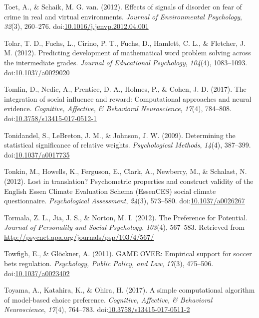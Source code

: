 \documentclass[english,man]{apa6}
\theoremstyle{definition}
\theoremstyle{definition}
\theoremstyle{definition}
\theoremstyle{remark}
\begin{document}
\hypertarget{ref-Toet2012}{}
Toet, A., \& Schaik, M. G. van. (2012). Effects of signals of disorder
on fear of crime in real and virtual environments. \emph{Journal of
Environmental Psychology}, \emph{32}(3), 260--276.
doi:\href{https://doi.org/10.1016/j.jenvp.2012.04.001}{10.1016/j.jenvp.2012.04.001}

\hypertarget{ref-Tolar2012}{}
Tolar, T. D., Fuchs, L., Cirino, P. T., Fuchs, D., Hamlett, C. L., \&
Fletcher, J. M. (2012). Predicting development of mathematical word
problem solving across the intermediate grades. \emph{Journal of
Educational Psychology}, \emph{104}(4), 1083--1093.
doi:\href{https://doi.org/10.1037/a0029020}{10.1037/a0029020}

\hypertarget{ref-Tomlin2017}{}
Tomlin, D., Nedic, A., Prentice, D. A., Holmes, P., \& Cohen, J. D.
(2017). The integration of social influence and reward: Computational
approaches and neural evidence. \emph{Cognitive, Affective, \&
Behavioral Neuroscience}, \emph{17}(4), 784--808.
doi:\href{https://doi.org/10.3758/s13415-017-0512-1}{10.3758/s13415-017-0512-1}

\hypertarget{ref-Tonidandel2009}{}
Tonidandel, S., LeBreton, J. M., \& Johnson, J. W. (2009). Determining
the statistical significance of relative weights. \emph{Psychological
Methods}, \emph{14}(4), 387--399.
doi:\href{https://doi.org/10.1037/a0017735}{10.1037/a0017735}

\hypertarget{ref-Tonkin2012}{}
Tonkin, M., Howells, K., Ferguson, E., Clark, A., Newberry, M., \&
Schalast, N. (2012). Lost in translation? Psychometric properties and
construct validity of the English Essen Climate Evaluation Schema
(EssenCES) social climate questionnaire. \emph{Psychological
Assessment}, \emph{24}(3), 573--580.
doi:\href{https://doi.org/10.1037/a0026267}{10.1037/a0026267}

\hypertarget{ref-Tormala2012}{}
Tormala, Z. L., Jia, J. S., \& Norton, M. I. (2012). The Preference for
Potential. \emph{Journal of Personality and Social Psychology},
\emph{103}(4), 567--583. Retrieved from
\url{http://psycnet.apa.org/journals/psp/103/4/567/}

\hypertarget{ref-Towfigh2011}{}
Towfigh, E., \& Glöckner, A. (2011). GAME OVER: Empirical support for
soccer bets regulation. \emph{Psychology, Public Policy, and Law},
\emph{17}(3), 475--506.
doi:\href{https://doi.org/10.1037/a0023402}{10.1037/a0023402}

\hypertarget{ref-Toyama2017}{}
Toyama, A., Katahira, K., \& Ohira, H. (2017). A simple computational
algorithm of model-based choice preference. \emph{Cognitive, Affective,
\& Behavioral Neuroscience}, \emph{17}(4), 764--783.
doi:\href{https://doi.org/10.3758/s13415-017-0511-2}{10.3758/s13415-017-0511-2}
\end{document}
